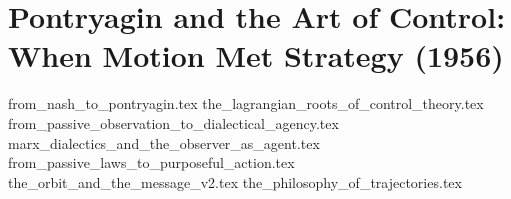 \section{Pontryagin and the Art of Control: When Motion Met Strategy (1956)}

{from_nash_to_pontryagin.tex}
{the_lagrangian_roots_of_control_theory.tex}
{from_passive_observation_to_dialectical_agency.tex}
{marx_dialectics_and_the_observer_as_agent.tex}
{from_passive_laws_to_purposeful_action.tex}
{the_orbit_and_the_message_v2.tex}
{the_philosophy_of_trajectories.tex}